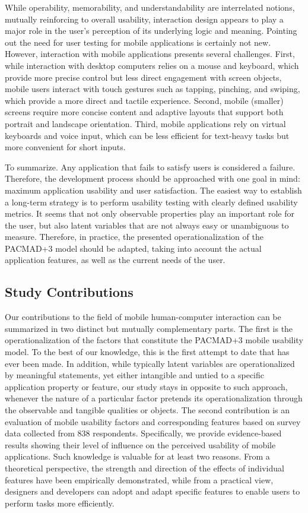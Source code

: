 \documentclass[preprint,12pt]{elsarticle}
\begin{document}
While operability, memorability, and understandability are interrelated notions, mutually reinforcing to overall usability, interaction design appears to play a major role in the user's perception of its underlying logic and meaning. Pointing out the need for user testing for mobile applications is certainly not new.  However, interaction with mobile applications presents several challenges. 
First, while interaction with desktop computers relies on a mouse and keyboard, which provide more precise control but less direct engagement with screen objects, mobile users interact with touch gestures such as tapping, pinching, and swiping, which provide a more direct and tactile experience. 
Second, mobile (smaller) screens require more concise content and adaptive layouts that support both portrait and landscape orientation. 
Third, mobile applications rely on virtual keyboards and voice input, which can be less efficient for text-heavy tasks but more convenient for short inputs.

To summarize. Any application that fails to satisfy users is considered a failure. Therefore, the development process should be approached with one goal in mind: maximum application usability and user satisfaction. The easiest way to establish a long-term strategy is to perform usability testing with clearly defined usability metrics. It seems that not only observable properties play an important role for the user, but also latent variables that are not always easy or unambiguous to measure. Therefore, in practice, the presented operationalization of the PACMAD+3 model should be adapted, taking into account the actual application features, as well as the current needs of the user. 

\subsection{Study Contributions}
Our contributions to the field of mobile human-computer interaction can be summarized in two distinct but mutually complementary parts. The first is the operationalization of the factors that constitute the PACMAD+3 mobile usability model. To the best of our knowledge, this is the first attempt to date that has ever been made. In addition, while typically latent variables are operationalized by meaningful statements, yet either intangible and untied to a specific application property or feature, our study stays in opposite to such approach, whenever the nature of a particular factor pretends its operationalization through the observable and tangible qualities or objects. The second contribution is an evaluation of mobile usability factors and corresponding features based on survey data collected from 838 respondents. Specifically, we provide evidence-based results showing their level of influence on the perceived usability of mobile applications. Such knowledge is valuable for at least two reasons. From a theoretical perspective, the strength and direction of the effects of individual features have been empirically demonstrated, while from a practical view, designers and developers can adopt and adapt specific features to enable users to perform tasks more efficiently.
\end{document}
